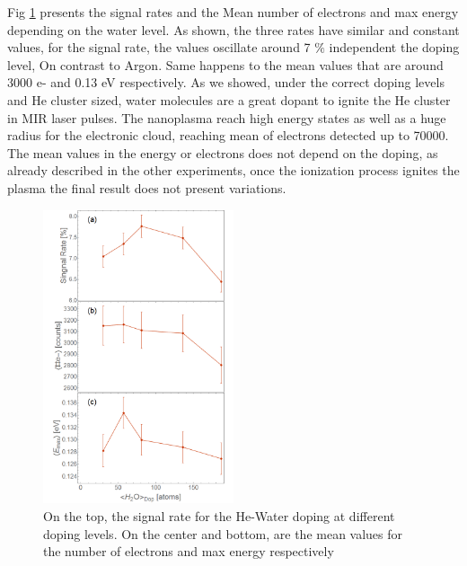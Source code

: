 

Fig \ref{fig:He-Watermean} presents the signal rates and the Mean number of electrons and max energy depending on the water level. As shown, the three rates have similar and constant values, for the signal rate, the values oscillate around 7 $\%$ independent the doping level, On contrast to Argon. Same happens to the mean values that are around 3000 e- and 0.13 eV respectively.
As we showed, under the correct doping levels and He cluster sized, water molecules are a great dopant to ignite the He cluster in MIR laser pulses. The nanoplasma reach high energy states as well as a huge radius for the electronic cloud, reaching mean of electrons detected up to 70000. The mean values in the energy or electrons does not depend on the doping, as already described in the other experiments, once the ionization process ignites the plasma  the final result does not present variations.

\begin{figure}[h!]
\centering
\includegraphics[width=0.5\textwidth]{../Images/results/MIR_He_waterDop/Alltogether.png} 
\caption[MIR He-Water doping, signal rate and mean values]{On the top, the signal rate for the He-Water doping at different doping levels. On the center and bottom, are the mean values for the number of electrons and max energy respectively}
\label{fig:He-Watermean}
\end{figure}

